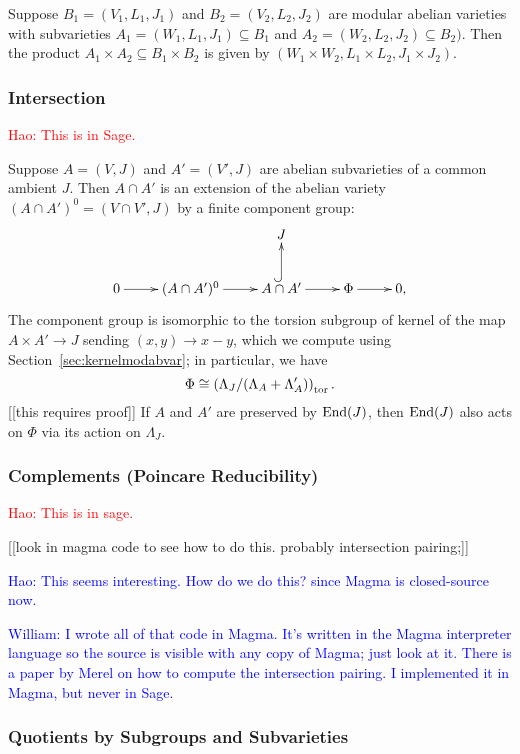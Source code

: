 \documentclass{article}
\newcommand{\Hao}[1]{\textcolor{blue}{\textsf{Hao: #1}}}
\newcommand{\wstein}[1]{\textcolor{blue}{\textsf{William: #1}}}
\newcommand{\Haonew}[1]{\textcolor{red}{\textsf{Hao: #1}}}
\begin{document}
Suppose $B_1=(V_1, L_1, J_1)$ and $B_2=(V_2, L_2, J_2)$ are modular abelian
varieties with subvarieties $A_1=(W_1, L_1, J_1)\subseteq B_1$ and $A_2=(W_2,
L_2, J_2)\subseteq B_2)$. Then the product $A_1\times A_2\subseteq B_1\times
B_2$ is given by $(W_1\times W_2, L_1\times L_2, J_1\times J_2)$.

\subsubsection{Intersection}

\Haonew{This is in Sage.}

Suppose $A = (V,J)$ and $A' = (V', J)$ are abelian subvarieties of a
common ambient $J$.  Then $A\cap A'$ is an extension of the abelian
variety $(A\cap A')^0 = (V\cap V', J)$ by a finite component group:
$$
\xymatrix{
   & & J & & \\
   0\ar[r]& (A\cap A')^0 \ar[r]&  A\cap A'\ar@{^(->}[u] \ar[r]& \Phi\ar[r] & 0,
}
$$
The component group is isomorphic to the torsion subgroup of kernel of
the map $A \times A' \to J$ sending $(x,y)\to x-y$, which we compute
using Section~\ref{sec:kernelmodabvar}; in particular, we have
$$
   \Phi \cong \left( \Lambda_J/(\Lambda_A + \Lambda_A')\right)_{\operatorname{tor}}.
$$
[[this requires proof]]
If $A$ and $A'$ are preserved by $\operatorname{End}(J)$, then $\operatorname{End}(J)$ also
acts on $\Phi$ via its action on $\Lambda_J$.



\subsubsection{Complements (Poincare Reducibility)}\label{sec:poincare}


\Haonew{This is in sage.}

[[look in magma code to see how to do this.  probably intersection
pairing;]]

\Hao{This seems interesting. How do we do this? since Magma is closed-source now.}

\wstein{I wrote all of that code in Magma.  It's written in the Magma interpreter language so the source is visible with any copy of Magma; just
look at it.  There is a paper by Merel on how to compute the
intersection pairing.  I implemented it in Magma, but never in Sage.}

\subsubsection{Quotients by Subgroups and Subvarieties}
\end{document}
